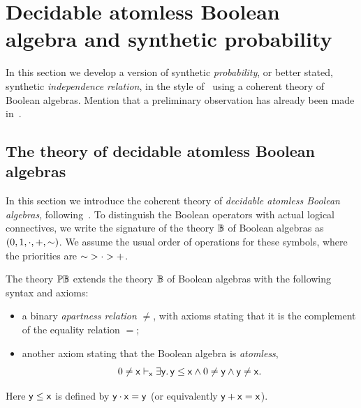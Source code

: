 \NewDocumentCommand{}
\NewDocumentCommand{}

\NewDocumentCommand{}
\NewDocumentCommand{}

\chapter{Decidable atomless Boolean algebra and synthetic probability}\label{ch:BAandprobability}

In this section we develop a version of synthetic \emph{probability}, or better stated, synthetic \emph{independence relation}, in the style of~\citet{SimpsonAlex2024EaCI} using a coherent theory of Boolean algebras. Mention that a preliminary observation has already been made in~\citet{hyttinen2016reduction}. 

\section{The theory of decidable atomless Boolean algebras}\label{sec:decatomlessBA}

In this section we introduce the coherent theory of \emph{decidable atomless Boolean algebras}, following~\citet[D3.4.12]{johnstone2002sketches}. To distinguish the Boolean operators with actual logical connectives, we write the signature of the theory $\mathbb{B}$ of Boolean algebras as $(0,1,\cdot,+,\mathord{\sim})$. We assume the usual order of operations for these symbols, where the priorities are $\mathord{\sim} > \cdot > +$.

\begin{definition}\label{def:atomlessBooleanalgebra}
  The theory $\mathbb{PB}$ extends the theory $\mathbb{B}$ of Boolean algebras with the following syntax and axioms:
  \begin{itemize}
    \item a binary \emph{apartness relation} $\neq$, with axioms stating that it is the complement of the equality relation $=$;
    \item another axiom stating that the Boolean algebra is \emph{atomless},
    \[ 0 \neq \mathsf{x} \vdash_{\mathsf{x}} \exists\mathsf{y}.\, \mathsf{y} \le \mathsf{x} \wedge 0 \neq \mathsf{y} \wedge \mathsf{y} \neq \mathsf{x}. \]
  \end{itemize}
  Here $\mathsf{y} \le \mathsf{x}$ is defined by $\mathsf{y} \cdot \mathsf{x} = \mathsf{y}$ (or equivalently $\mathsf{y} + \mathsf{x} = \mathsf{x}$). 
\end{definition}


